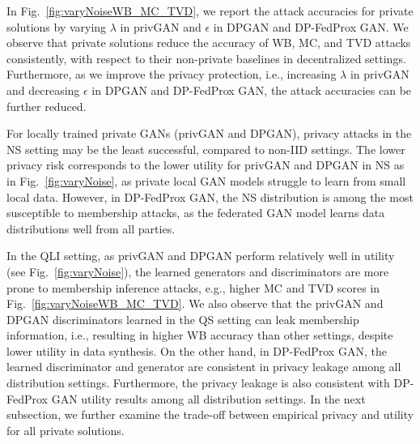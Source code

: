 \documentclass[conference]{IEEEtran}
\begin{document}
In Fig.~\ref{fig:varyNoiseWB_MC_TVD}, we report the attack accuracies for private solutions by varying $\lambda$ in privGAN and $\epsilon$ in DPGAN and DP-FedProx GAN.  We observe that private solutions reduce the accuracy of WB, MC, and TVD attacks consistently, with respect to their non-private baselines in decentralized settings.  Furthermore, as we improve the privacy protection, i.e., increasing $\lambda$ in privGAN and decreasing $\epsilon$ in DPGAN and DP-FedProx GAN, the attack accuracies can be further reduced.  


For locally trained private GANs (privGAN and DPGAN), privacy attacks in the NS setting may be the least successful, compared to non-IID settings.  The lower privacy risk corresponds to the lower utility for privGAN and DPGAN in NS as in Fig.~\ref{fig:varyNoise}, as private local GAN models struggle to learn from small local data.  However, in DP-FedProx GAN, the NS distribution is among the most susceptible to membership attacks, as the federated GAN model learns data distributions well from all parties. 

In the QLI setting, as privGAN and DPGAN perform relatively well in utility (see Fig.~\ref{fig:varyNoise}), the learned generators and discriminators are more prone to membership inference attacks, e.g., higher MC and TVD scores in Fig.~\ref{fig:varyNoiseWB_MC_TVD}.  We also observe that the privGAN and DPGAN discriminators learned in the QS setting can leak membership information, i.e., resulting in higher WB accuracy than other settings, despite lower utility in data synthesis.  On the other hand, in DP-FedProx GAN, the learned discriminator and generator are consistent in privacy leakage among all distribution settings.  Furthermore, the privacy leakage is also consistent with DP-FedProx GAN utility results among all distribution settings.  In the next subsection, we further examine the trade-off between empirical privacy and utility for all private solutions.



\end{document}
